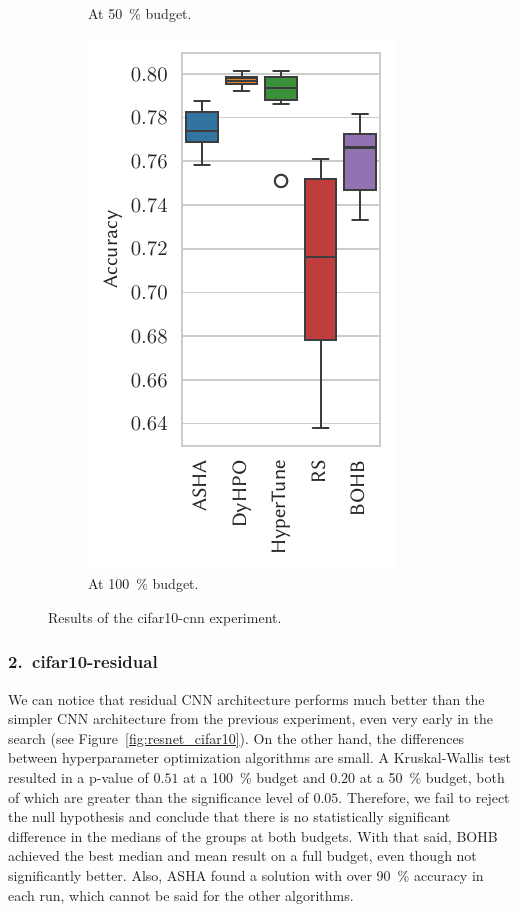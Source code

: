 \begin{figure}[H]
\begin{subfigure}{.26\textwidth}
        \caption{At \SI{50}{\percent} budget.}%
    \end{subfigure}%
    \begin{subfigure}{.26\textwidth}
        \includegraphics[height=\plotheight]{img/real_exp/cifar10_simple_boxplot_full.pdf}%
        \caption{At \SI{100}{\percent} budget.}%
    \end{subfigure}%
\caption{Results of the cifar10-cnn experiment.}
\label{fig:simple_cifar}
\end{figure}

\subsubsection{2.\ cifar10-residual}
We can notice that residual CNN architecture performs much better than the simpler CNN architecture from the previous experiment, even very early in the search (see Figure~\ref{fig:resnet_cifar10}). On the other hand, the differences between hyperparameter optimization algorithms are small. A Kruskal-Wallis test resulted in a p-value of $0.51$ at a \SI{100}{\percent} budget and $0.20$ at a \SI{50}{\percent} budget, both of which are greater than the significance level of $0.05$. Therefore, we fail to reject the null hypothesis and conclude that there is no statistically significant difference in the medians of the groups at both budgets. With that said, BOHB achieved the best median and mean result on a full budget, even though not significantly better. Also, ASHA found a solution with over \SI{90}{\percent} accuracy in each run, which cannot be said for the other algorithms.

